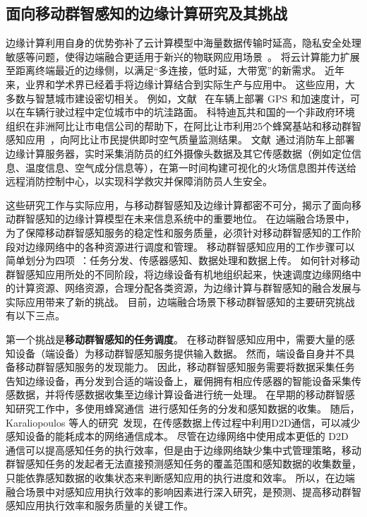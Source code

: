 \subsection{面向移动群智感知的边缘计算研究及其挑战}

边缘计算利用自身的优势弥补了云计算模型中海量数据传输时延高，隐私安全处理敏感等问题，使得边端融合更适用于新兴的物联网应用场景~\cite{DBLP:journals/cm/SunA16}。
将云计算能力扩展至距离终端最近的边缘侧，以满足“多连接，低时延，大带宽”的新需求。
近年来，业界和学术界已经着手将边缘计算结合到实际生产与应用中。
这些应用，大多数与智慧城市建设密切相关。
例如，文献~ 在车辆上部署 GPS 和加速度计，可以在车辆行驶过程中定位城市中的坑洼路面。
科特迪瓦共和国的一个非政府环境组织在非洲阿比让市电信公司的帮助下，在阿比让市利用25个蜂窝基站和移动群智感知应用~\cite{DBLP:conf/huc/ZhangXWC14}，向阿比让市民提供即时空气质量监测结果。
文献~通过消防车上部署边缘计算服务器，实时采集消防员的红外摄像头数据及其它传感数据（例如定位信息、温度信息、空气成分信息等），在第一时间构建可视化的火场信息图并传送给远程消防控制中心，以实现科学救灾并保障消防员人生安全。

这些研究工作与实际应用，与移动群智感知及边缘计算都密不可分，揭示了面向移动群智感知的边缘计算模型在未来信息系统中的重要地位。
在边端融合场景中，为了保障移动群智感知服务的稳定性和服务质量，必须针对移动群智感知的工作阶段对边缘网络中的各种资源进行调度和管理。
移动群智感知应用的工作步骤可以简单划分为四项~\cite{zh_cn:shi}：任务分发、传感器感知、数据处理和数据上传。
如何针对移动群智感知应用所处的不同阶段，将边缘设备有机地组织起来，快速调度边缘网络中的计算资源、网络资源，合理分配各类资源，为边缘计算与群智感知的融合发展与实际应用带来了新的挑战。
目前，边端融合场景下移动群智感知的主要研究挑战有以下三点。

第一个挑战是\textbf{移动群智感知的任务调度}。
在移动群智感知应用中，需要大量的感知设备（端设备）为移动群智感知服务提供输入数据。
然而，端设备自身并不具备移动群智感知服务的发现能力。
因此，移动群智感知服务需要将数据采集任务告知边缘设备，再分发到合适的端设备上，雇佣拥有相应传感器的智能设备采集传感数据，并将传感数据收集至边缘计算设备进行统一处理。
在早期的移动群智感知研究工作中，多使用蜂窝通信~\cite{DBLP:conf/globecom/ZhangJLLC16,DBLP:conf/icdcs/XiaoWHHH16}进行感知任务的分发和感知数据的收集。
随后，Karaliopoulos 等人的研究~\cite{DBLP:conf/infocom/KaraliopoulosTK15}发现，在传感数据上传过程中利用D2D通信，可以减少感知设备的能耗成本的网络通信成本。
尽管在边缘网络中使用成本更低的 D2D 通信可以提高感知任务的执行效率，但是由于边缘网络缺少集中式管理策略，移动群智感知任务的发起者无法直接预测感知任务的覆盖范围和感知数据的收集数量，只能依靠感知数据的收集状态来判断感知应用的执行进度和效率。
所以，在边端融合场景中对感知应用执行效率的影响因素进行深入研究，是预测、提高移动群智感知应用执行效率和服务质量的关键工作。


